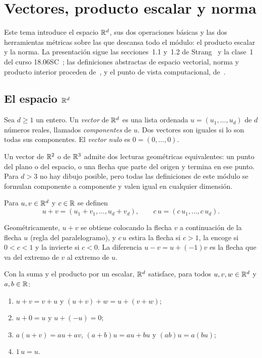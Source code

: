 \chapter{Vectores, producto escalar y norma}
\label{tema:1}

Este tema introduce el espacio $\mathbb{R}^{d}$, sus dos operaciones básicas y las dos herramientas métricas sobre las que descansa todo el módulo: el producto escalar y la norma. La presentación sigue las secciones~1.1 y~1.2 de Strang~\cite{strang} y la clase~1 del curso 18.06SC~\cite{mit1806sc}; las definiciones abstractas de espacio vectorial, norma y producto interior proceden de~\cite[§2.4, §3.1 y §3.2]{mml}, y el punto de vista computacional, de~\cite[cap.~1 y §3.1]{vmls}.

\section{El espacio \texorpdfstring{$\mathbb{R}^{d}$}{ℝᵈ}}

\begin{definicion}[Vector]
Sea $d\ge 1$ un entero. Un \emph{vector} de $\mathbb{R}^{d}$ es una lista ordenada $u=(u_1,\dots,u_d)$ de $d$ números reales, llamados \emph{componentes} de $u$. Dos vectores son iguales si lo son todas sus componentes. El \emph{vector nulo} es $0=(0,\dots,0)$.
\end{definicion}

Un vector de $\mathbb{R}^{2}$ o de $\mathbb{R}^{3}$ admite dos lecturas geométricas equivalentes: un punto del plano o del espacio, o una flecha que parte del origen y termina en ese punto. Para $d>3$ no hay dibujo posible, pero todas las definiciones de este módulo se formulan componente a componente y valen igual en cualquier dimensión.

\begin{definicion}
Para $u,v\in\mathbb{R}^{d}$ y $c\in\mathbb{R}$ se definen
\[
u+v=(u_1+v_1,\dots,u_d+v_d),\qquad c\,u=(c\,u_1,\dots,c\,u_d).
\]
\end{definicion}

Geométricamente, $u+v$ se obtiene colocando la flecha $v$ a continuación de la flecha $u$ (regla del paralelogramo), y $c\,u$ estira la flecha si $c>1$, la encoge si $0<c<1$ y la invierte si $c<0$. La diferencia $u-v=u+(-1)v$ es la flecha que va del extremo de $v$ al extremo de $u$.

\begin{proposicion}\label{prop:ev}
Con la suma y el producto por un escalar, $\mathbb{R}^{d}$ satisface, para todos $u,v,w\in\mathbb{R}^{d}$ y $a,b\in\mathbb{R}$:
\begin{enumerate}
  \item $u+v=v+u$ y $(u+v)+w=u+(v+w)$;
  \item $u+0=u$ y $u+(-u)=0$;
  \item $a(u+v)=au+av$, $(a+b)u=au+bu$ y $(ab)u=a(bu)$;
  \item $1\,u=u$.
\end{enumerate}
\end{proposicion}

